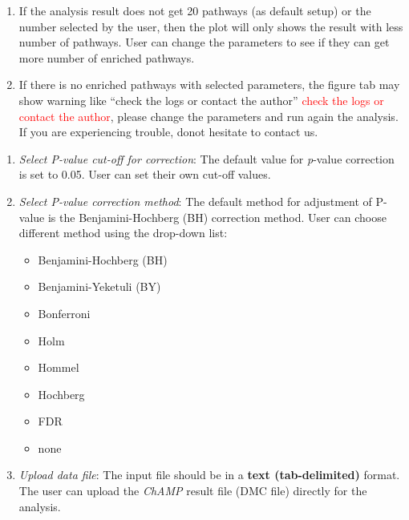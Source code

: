 \documentclass[
  a4paper,
  oneside,
  open=any]{scrreport}
\providecommand{\tightlist}{%
  \setlength{\itemsep}{0pt}\setlength{\parskip}{0pt}}\usepackage{longtable,booktabs,array}
\begin{document}
\begin{tcolorbox}[enhanced jigsaw, title=\textcolor{quarto-callout-tip-color}{\faLightbulb}\hspace{0.5em}{Tip}, rightrule=.15mm, coltitle=black, colback=white, opacitybacktitle=0.6, colframe=quarto-callout-tip-color-frame, colbacktitle=quarto-callout-tip-color!10!white, opacityback=0, leftrule=.75mm, bottomtitle=1mm, toptitle=1mm, breakable, left=2mm, titlerule=0mm, arc=.35mm, toprule=.15mm, bottomrule=.15mm]

\begin{enumerate}
\def\labelenumi{\arabic{enumi}.}
\tightlist
\item
  If the analysis result does not get 20 pathways (as default setup) or
  the number selected by the user, then the plot will only shows the
  result with less number of pathways. User can change the parameters to
  see if they can get more number of enriched pathways.
\item
  If there is no enriched pathways with selected parameters, the figure
  tab may show warning like {``check the logs or contact the author''}
  \textcolor{red}{check the logs or contact the author}, please change
  the parameters and run again the analysis. If you are experiencing
  trouble, donot hesitate to contact us.
\end{enumerate}

\end{tcolorbox}

\begin{enumerate}
\def\labelenumi{\arabic{enumi}.}
\setcounter{enumi}{3}
\item
  \emph{Select P-value cut-off for correction}: The default value for
  \emph{p}-value correction is set to 0.05. User can set their own
  cut-off values.
\item
  \emph{Select P-value correction method}: The default method for
  adjustment of P-value is the Benjamini-Hochberg (BH) correction
  method. User can choose different method using the drop-down list:

  \begin{itemize}
  \tightlist
  \item
    Benjamini-Hochberg (BH)
  \item
    Benjamini-Yeketuli (BY)
  \item
    Bonferroni
  \item
    Holm
  \item
    Hommel
  \item
    Hochberg
  \item
    FDR
  \item
    none
  \end{itemize}
\item
  \emph{Upload data file}: The input file should be in a \textbf{text
  (tab-delimited)} format. The user can upload the \emph{ChAMP} result
  file (DMC file) directly for the analysis.
\end{enumerate}
\end{document}
